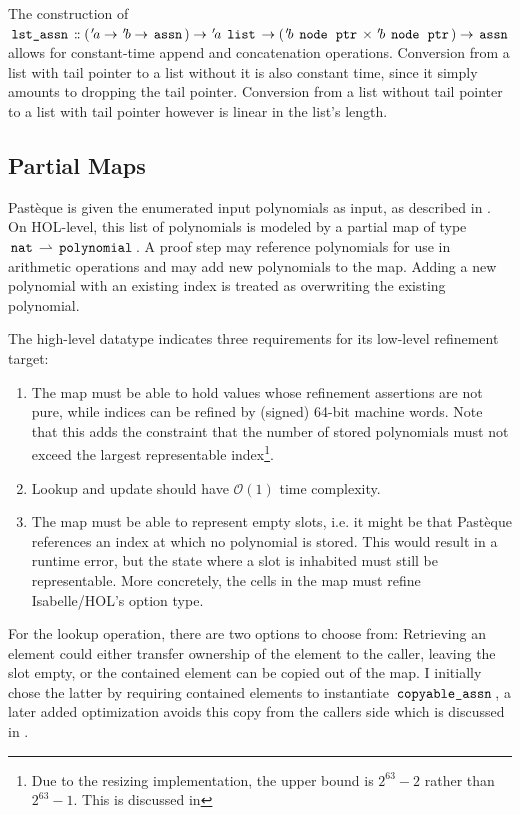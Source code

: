 The construction of $\,\text{\ttfamily lst\_assn}\, \mathrel{\mathord{:}\mkern-1.2mu\mathord{:}} ({\mskip2mu '\mskip-2mua} \rightarrow {\mskip2mu '\mskip-2mub} \rightarrow \,\text{\ttfamily assn}\,) \rightarrow {\mskip2mu '\mskip-2mua} \; \,\text{\ttfamily list}\, \rightarrow ({\mskip2mu '\mskip-2mub} \; \,\text{\ttfamily node}\, \; \,\text{\ttfamily ptr}\, \times {\mskip2mu '\mskip-2mub} \; \,\text{\ttfamily node}\, \; \,\text{\ttfamily ptr}\,) \rightarrow \,\text{\ttfamily assn}\,$ allows for constant-time append and concatenation operations.
Conversion from a list with tail pointer to a list without it is also constant time, since it simply amounts to dropping the tail pointer.
Conversion from a list without tail pointer to a list with tail pointer however is linear in the list's length.

\subsection{Partial Maps}\label{sec:partial-maps}

Pastèque is given the enumerated input polynomials as input, as described in .
On HOL-level, this list of polynomials is modeled by a partial map of type $\,\text{\ttfamily nat}\, \rightharpoonup \,\text{\ttfamily polynomial}\,$.
A proof step may reference polynomials for use in arithmetic operations and may add new polynomials to the map.
Adding a new polynomial with an existing index is treated as overwriting the existing polynomial.

The high-level datatype indicates three requirements for its low-level refinement target:
\begin{enumerate}
	\item The map must be able to hold values whose refinement assertions are not pure, while indices can be refined by (signed) 64-bit machine words. Note that this adds the constraint that the number of stored polynomials must not exceed the largest representable index\footnote{Due to the resizing implementation, the upper bound is $2^{63}-2$ rather than $2^{63}-1$. This is discussed in }.
	\item Lookup and update should have $\mathcal{O}(1)$ time complexity.
	\item The map must be able to represent empty slots, i.e. it might be that Pastèque references an index at which no polynomial is stored.
	      This would result in a runtime error, but the state where a slot is inhabited must still be representable.
	      More concretely, the cells in the map must refine Isabelle/HOL's option type.
\end{enumerate}
For the lookup operation, there are two options to choose from:
Retrieving an element could either transfer ownership of the element to the caller, leaving the slot empty, or the contained element can be copied out of the map.
I initially chose the latter by requiring contained elements to instantiate $\,\text{\ttfamily copyable\_assn}\,$, a later added optimization avoids this copy from the callers side which is discussed in .

